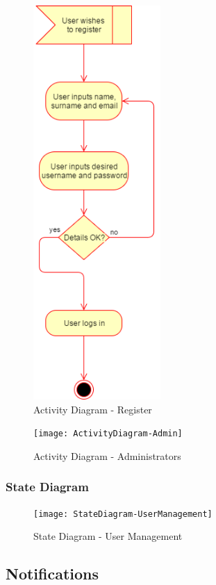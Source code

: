 \documentclass{article}
\begin{document}
		\begin{figure}[H]
  			\caption{Activity Diagram - Register}
  			\centering
    			\includegraphics[height=15cm]{ActivityDiagram-Register}
		\end{figure}
		
		\begin{figure}[H]
  			\caption{Activity Diagram - Administrators}
  			\centering
    			\texttt{[image: ActivityDiagram-Admin]}
		\end{figure}
		
		\newpage
        \subsubsection{State Diagram}
        	\begin{figure}[H]
  			\caption{State Diagram - User Management}
  			\centering
    			\texttt{[image: StateDiagram-UserManagement]}
		\end{figure}
	\newpage
    \subsection{Notifications}
\end{document}
